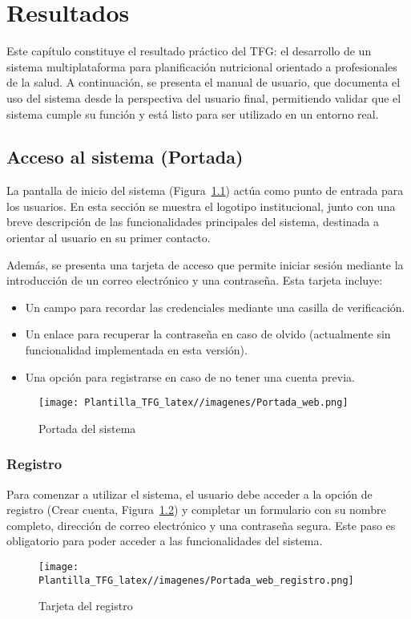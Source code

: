 \chapter{Resultados}\label{capitulo7}
Este capítulo constituye el resultado práctico del TFG: el desarrollo de un sistema multiplataforma para planificación nutricional orientado a profesionales de la salud. A continuación, se presenta el manual de usuario, que documenta el uso del sistema desde la perspectiva del usuario final, permitiendo validar que el sistema cumple su función y está listo para ser utilizado en un entorno real.

\section{Acceso al sistema (Portada)}
La pantalla de inicio del sistema (Figura~\ref{fig:Portada_web}) actúa como punto de entrada para los usuarios. En esta sección se muestra el logotipo institucional, junto con una breve descripción de las funcionalidades principales del sistema, destinada a orientar al usuario en su primer contacto.

Además, se presenta una tarjeta de acceso que permite iniciar sesión mediante la introducción de un correo electrónico y una contraseña. Esta tarjeta incluye:
\begin{itemize}
    \item Un campo para recordar las credenciales mediante una casilla de verificación.
    \item Un enlace para recuperar la contraseña en caso de olvido (actualmente sin funcionalidad implementada en esta versión).
    \item Una opción para registrarse en caso de no tener una cuenta previa.
\end{itemize}

\begin{figure}[t]
    \centering
    \texttt{[image: Plantilla\_TFG\_latex//imagenes/Portada\_web.png]}
    \caption{Portada del sistema}
    \label{fig:Portada_web}
\end{figure}

\subsection{Registro}
Para comenzar a utilizar el sistema, el usuario debe acceder a la opción de registro (Crear cuenta, Figura~\ref{fig:Portada_web_registro}) y completar un formulario con su nombre completo, dirección de correo electrónico y una contraseña segura. Este paso es obligatorio para poder acceder a las funcionalidades del sistema.
\begin{figure}[H]
    \centering
    \texttt{[image: Plantilla\_TFG\_latex//imagenes/Portada\_web\_registro.png]}
    \caption{Tarjeta del registro}
    \label{fig:Portada_web_registro}
\end{figure}

